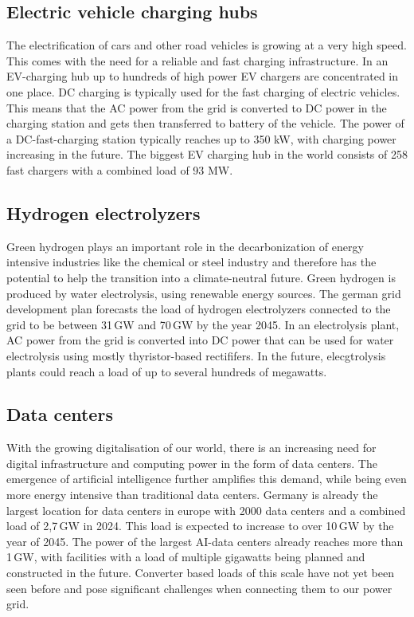 \documentclass[conference]{IEEEtran}
\begin{document}
\subsection{Electric vehicle charging hubs}
The electrification of cars and other road vehicles is growing at a very high speed. This comes with the need for a reliable and fast charging infrastructure. In an EV-charging hub up to hundreds of high power EV chargers are concentrated in one place. DC charging is typically used for the fast charging of electric vehicles. This means that the AC power from the grid is converted to DC power in the charging station and gets then transferred to battery of the vehicle. The power of a DC-fast-charging station typically reaches up to 350 kW, with charging power increasing in the future. The biggest EV charging hub in the world consists of 258 fast chargers with a combined load of 93 MW\cite{evcharger}.

\subsection{Hydrogen electrolyzers}
Green hydrogen plays an important role in the decarbonization of energy intensive industries like the chemical or steel industry and therefore has the potential to help the transition into a climate-neutral future. Green hydrogen is produced by water electrolysis, using renewable energy sources. The german grid development plan forecasts the load of hydrogen electrolyzers connected to the grid to be between 31\,GW and 70\,GW by the year 2045\cite{nep}. In an electrolysis plant, AC power from the grid is converted into DC power that can be used for water electrolysis using mostly thyristor-based rectififers. In the future, elecgtrolysis plants could reach a load of up to several hundreds of megawatts.

\subsection{Data centers}
With the growing digitalisation of our world, there is an increasing need for digital infrastructure and computing power in the form of data centers. The emergence of artificial intelligence further amplifies this demand, while being even more energy intensive than traditional data centers. Germany is already the largest location for data centers in europe with 2000 data centers and a combined load of 2,7\,GW in 2024. This load is expected to increase to over 10\,GW by the year of 2045\cite{standrechenzentren}. The power of the largest AI-data centers already reaches more than 1\,GW, with facilities with a load of multiple gigawatts being planned and constructed in the future. Converter based loads of this scale have not yet been seen before and pose significant challenges when connecting them to our power grid.
\end{document}
